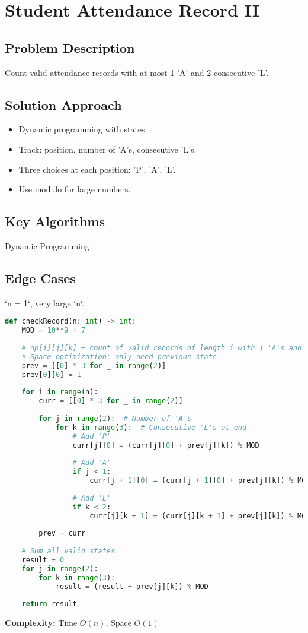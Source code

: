 \documentclass[10pt, a4paper]{article}
\begin{document}
\section{Student Attendance Record II}
\subsection*{Problem Description}
Count valid attendance records with at most 1 'A' and 2 consecutive 'L'.

\subsection*{Solution Approach}
\begin{itemize}
    \item Dynamic programming with states.
    \item Track: position, number of 'A's, consecutive 'L's.
    \item Three choices at each position: 'P', 'A', 'L'.
    \item Use modulo for large numbers.
\end{itemize}

\subsection*{Key Algorithms}
Dynamic Programming

\subsection*{Edge Cases}
`n = 1`, very large `n`.

\begin{lstlisting}[language=Python]
def checkRecord(n: int) -> int:
    MOD = 10**9 + 7
    
    # dp[i][j][k] = count of valid records of length i with j 'A's and ending with k consecutive 'L's
    # Space optimization: only need previous state
    prev = [[0] * 3 for _ in range(2)]
    prev[0][0] = 1
    
    for i in range(n):
        curr = [[0] * 3 for _ in range(2)]
        
        for j in range(2):  # Number of 'A's
            for k in range(3):  # Consecutive 'L's at end
                # Add 'P'
                curr[j][0] = (curr[j][0] + prev[j][k]) % MOD
                
                # Add 'A'
                if j < 1:
                    curr[j + 1][0] = (curr[j + 1][0] + prev[j][k]) % MOD
                
                # Add 'L'
                if k < 2:
                    curr[j][k + 1] = (curr[j][k + 1] + prev[j][k]) % MOD
        
        prev = curr
    
    # Sum all valid states
    result = 0
    for j in range(2):
        for k in range(3):
            result = (result + prev[j][k]) % MOD
    
    return result
\end{lstlisting}
\textbf{Complexity:} Time $O(n)$, Space $O(1)$
\end{document}
